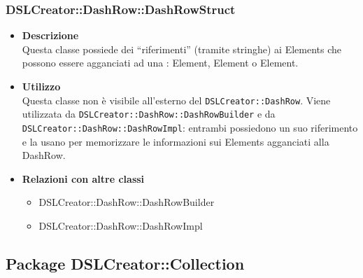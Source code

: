  \subsubsection{DSLCreator::DashRow::DashRowStruct}
                    \begin{itemize}
                        \item \textbf{Descrizione} \hfill \\
                            Questa classe possiede dei ``riferimenti'' (tramite stringhe) ai  Elements che possono essere agganciati ad una :  Element,  Element o  Element.
                        \item \textbf{Utilizzo} \hfill \\
                            Questa classe non è visibile all'esterno del  \texttt{DSLCreator::DashRow}. Viene utilizzata da \texttt{DSLCreator::DashRow::DashRowBuilder} e da \texttt{DSLCreator::Dash\-Row::DashRowImpl}: entrambi possiedono un suo riferimento e la usano per memorizzare le informazioni sui  Elements agganciati alla DashRow.
                        \item \textbf{Relazioni con altre classi}
                            \begin{itemize}
                              \item DSLCreator::DashRow::DashRowBuilder
                              \item DSLCreator::DashRow::DashRowImpl
                            \end{itemize}
                    \end{itemize}

\subsection{Package DSLCreator::Collection}
